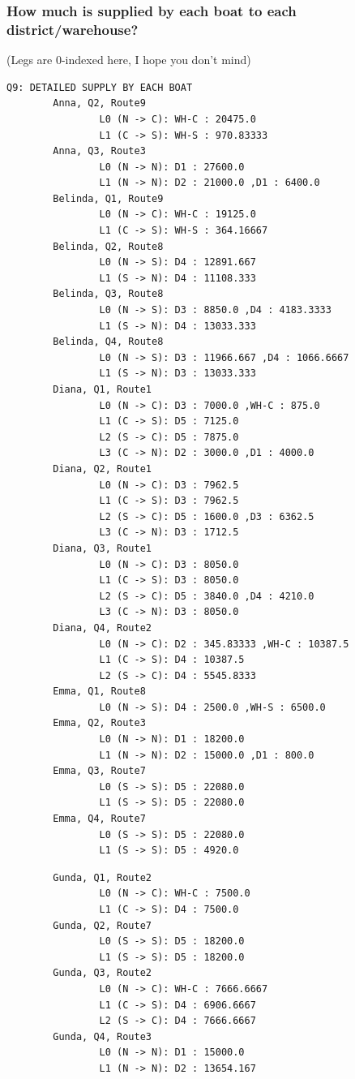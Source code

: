 \documentclass[10pt]{article}
\begin{document}
\subsubsection{How much is supplied by each boat to each district/warehouse?}
(Legs are 0-indexed here, I hope you don't mind)
\begin{verbatim}
Q9: DETAILED SUPPLY BY EACH BOAT 
        Anna, Q2, Route9
                L0 (N -> C): WH-C : 20475.0
                L1 (C -> S): WH-S : 970.83333
        Anna, Q3, Route3
                L0 (N -> N): D1 : 27600.0
                L1 (N -> N): D2 : 21000.0 ,D1 : 6400.0
        Belinda, Q1, Route9
                L0 (N -> C): WH-C : 19125.0
                L1 (C -> S): WH-S : 364.16667
        Belinda, Q2, Route8
                L0 (N -> S): D4 : 12891.667
                L1 (S -> N): D4 : 11108.333
        Belinda, Q3, Route8
                L0 (N -> S): D3 : 8850.0 ,D4 : 4183.3333
                L1 (S -> N): D4 : 13033.333
        Belinda, Q4, Route8
                L0 (N -> S): D3 : 11966.667 ,D4 : 1066.6667
                L1 (S -> N): D3 : 13033.333
        Diana, Q1, Route1
                L0 (N -> C): D3 : 7000.0 ,WH-C : 875.0
                L1 (C -> S): D5 : 7125.0
                L2 (S -> C): D5 : 7875.0
                L3 (C -> N): D2 : 3000.0 ,D1 : 4000.0
        Diana, Q2, Route1
                L0 (N -> C): D3 : 7962.5
                L1 (C -> S): D3 : 7962.5
                L2 (S -> C): D5 : 1600.0 ,D3 : 6362.5
                L3 (C -> N): D3 : 1712.5
        Diana, Q3, Route1
                L0 (N -> C): D3 : 8050.0
                L1 (C -> S): D3 : 8050.0
                L2 (S -> C): D5 : 3840.0 ,D4 : 4210.0
                L3 (C -> N): D3 : 8050.0
        Diana, Q4, Route2
                L0 (N -> C): D2 : 345.83333 ,WH-C : 10387.5
                L1 (C -> S): D4 : 10387.5
                L2 (S -> C): D4 : 5545.8333
        Emma, Q1, Route8
                L0 (N -> S): D4 : 2500.0 ,WH-S : 6500.0
        Emma, Q2, Route3
                L0 (N -> N): D1 : 18200.0
                L1 (N -> N): D2 : 15000.0 ,D1 : 800.0
        Emma, Q3, Route7
                L0 (S -> S): D5 : 22080.0
                L1 (S -> S): D5 : 22080.0
        Emma, Q4, Route7
                L0 (S -> S): D5 : 22080.0
                L1 (S -> S): D5 : 4920.0
\end{verbatim}
\newpage 
\begin{verbatim}
        Gunda, Q1, Route2
                L0 (N -> C): WH-C : 7500.0
                L1 (C -> S): D4 : 7500.0
        Gunda, Q2, Route7
                L0 (S -> S): D5 : 18200.0
                L1 (S -> S): D5 : 18200.0
        Gunda, Q3, Route2
                L0 (N -> C): WH-C : 7666.6667
                L1 (C -> S): D4 : 6906.6667
                L2 (S -> C): D4 : 7666.6667
        Gunda, Q4, Route3
                L0 (N -> N): D1 : 15000.0
                L1 (N -> N): D2 : 13654.167
\end{verbatim}
\end{document}
